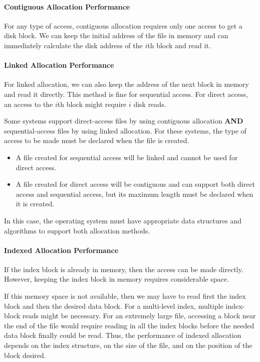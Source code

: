 \paragraph{Contiguous Allocation Performance}\label{par:Contiguous_File_Allocation_Performance}
For any type of access, contiguous allocation requires only one access to get a disk block.
We can keep the initial address of the file in memory and can immediately calculate the disk address of the $i$th block and read it.

\paragraph{Linked Allocation Performance}\label{par:Linked_File_Allocation_Performance}
For linked allocation, we can also keep the address of the next block in memory and read it directly.
This method is fine for sequential access.
For direct access, an access to the $i$th block might require $i$ disk reads.

Some systems support direct-access files by using contiguous allocation \textbf{AND} sequential-access files by using linked allocation.
For these systems, the type of access to be made must be declared when the file is created.

\begin{itemize}[noitemsep]
\item A file created for sequential access will be linked and cannot be used for direct access.
\item A file created for direct access will be contiguous and can support both direct access and sequential access, but its maximum length must be declared when it is created.
\end{itemize}

In this case, the operating system must have appropriate data structures and algorithms to support both allocation methods.

\paragraph{Indexed Allocation Performance}\label{par:Indexed_File_Allocation_Performance}
If the index block is already in memory,
then the access can be made directly.
However, keeping the index block in
memory requires considerable space.

If this memory space is not available, then we may have to read first the index block and then the desired data block.
For a multi-level index, multiple index-block reads might be necessary.
For an extremely large file, accessing a block near the end of the file would require reading in all the index blocks before the needed data block finally could be read.
Thus, the performance of indexed allocation depends on the index structure, on the size of the file, and on the position of the block desired.

